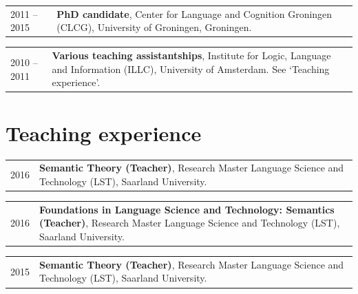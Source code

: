 \documentclass[a4paper,10pt]{article}
\def\leftcolwidth{.12\textwidth}
\def\tablevspace{10pt}
\begin{document}
\vspace{\tablevspace}

\noindent
\begin{tabularx}{\textwidth}{ p{\leftcolwidth} X }
  2011 -- 2015  
  & \textbf{PhD candidate}, Center for Language and Cognition
      Groningen (CLCG), University of Groningen, Groningen.\\
\end{tabularx}

\vspace{\tablevspace}

\noindent
\begin{tabularx}{\textwidth}{ p{\leftcolwidth} X }
  2010 -- 2011
  & \textbf{Various teaching assistantships}, Institute for Logic,
      Language and Information (ILLC), University of Amsterdam. See
      `Teaching experience'.\\
\end{tabularx}


\section*{Teaching experience}

\noindent
\begin{tabularx}{\textwidth}{ p{\leftcolwidth} X }
  2016
  & \textbf{Semantic Theory (Teacher)}, Research Master Language
    Science and Technology (LST), Saarland University.\\
\end{tabularx}

\vspace{\tablevspace}

\noindent
\begin{tabularx}{\textwidth}{ p{\leftcolwidth} X }
  2016
  & \textbf{Foundations in Language Science and Technology: Semantics
    (Teacher)}, Research Master Language Science and Technology (LST),
    Saarland University.\\
\end{tabularx}

\vspace{\tablevspace}

\noindent
\begin{tabularx}{\textwidth}{ p{\leftcolwidth} X }
  2015
  & \textbf{Semantic Theory (Teacher)}, Research Master Language
    Science and Technology (LST), Saarland University.\\
\end{tabularx}
\end{document}

